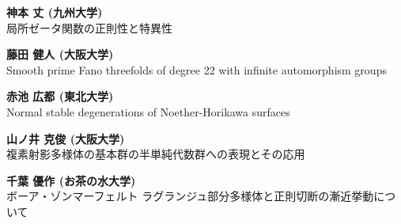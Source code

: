 \documentclass[dvipdfmx,a4paper,12pt]{article}
\theoremstyle{plain} %
\theoremstyle{definition} %
\begin{document}
{\bf 神本 丈 (九州大学)}\\
局所ゼータ関数の正則性と特異性

\vskip5mm

\vskip1mm
{\bf 藤田 健人 (大阪大学)}\\
Smooth prime Fano threefolds of degree 22 with infinite automorphism groups 
\vskip3mm

{\bf 赤池 広都 (東北大学)}\\
Normal stable degenerations of Noether-Horikawa surfaces
\vskip3mm

{\bf 山ノ井 克俊 (大阪大学) }\\
複素射影多様体の基本群の半単純代数群への表現とその応用
\vskip3mm

{\bf 千葉 優作 (お茶の水大学)}\\
ボーア・ゾンマーフェルト ラグランジュ部分多様体と正則切断の漸近挙動について

\newpage 

\end{document}
